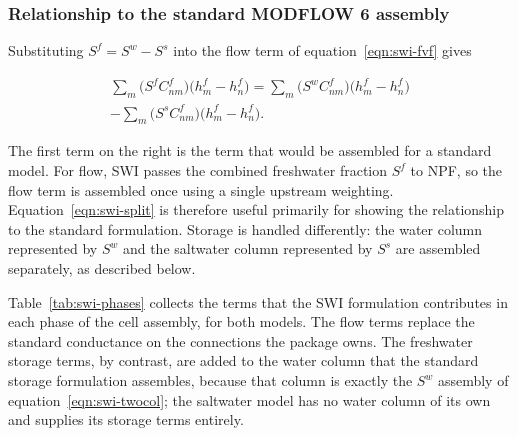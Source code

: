 \subsubsection{Relationship to the standard MODFLOW 6 assembly}
\label{sec:swi-split}

Substituting $S^{f}=S^{w}-S^{s}$ into the flow term of equation~\ref{eqn:swi-fvf} gives

\begin{multline}
\label{eqn:swi-split}
\sum_{m}\big(S^{f}C_{nm}^{f}\big)\big(h_{m}^{f}-h_{n}^{f}\big)=
\sum_{m}\big(S^{w}C_{nm}^{f}\big)\big(h_{m}^{f}-h_{n}^{f}\big)\\
-\sum_{m}\big(S^{s}C_{nm}^{f}\big)\big(h_{m}^{f}-h_{n}^{f}\big).
\end{multline}

\noindent The first term on the right is the term that would be assembled for a standard \mf model. For flow, SWI passes the combined freshwater fraction $S^{f}$ to NPF, so the flow term is assembled once using a single upstream weighting. Equation~\ref{eqn:swi-split} is therefore useful primarily for showing the relationship to the standard formulation. Storage is handled differently: the water column represented by $S^{w}$ and the saltwater column represented by $S^{s}$ are assembled separately, as described below.

Table~\ref{tab:swi-phases} collects the terms that the SWI formulation contributes in each phase of the \mf cell assembly, for both models. The flow terms replace the standard conductance on the connections the package owns. The freshwater storage terms, by contrast, are added to the water column that the standard storage formulation assembles, because that column is exactly the $S^{w}$ assembly of equation~\ref{eqn:swi-twocol}; the saltwater model has no water column of its own and supplies its storage terms entirely.

